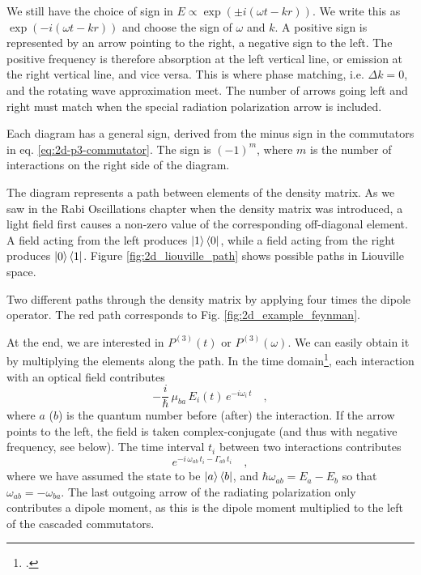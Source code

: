 We still have the choice of sign in $E \propto \exp( \pm i (\omega t - k r) )$. We write this as $\exp(- i (\omega t - k r) )$ and choose the sign of $\omega$ and $k$.
A positive sign is represented by an arrow pointing to the right, a negative sign to the left. The positive frequency is therefore absorption at the left vertical line, or emission at the right vertical line, and vice versa. This is where phase matching, i.e. $\Delta k = 0$, and the rotating wave approximation meet. The number of arrows going left and right must match when the special radiation polarization arrow is included.

Each diagram has a general sign, derived from the minus sign in the commutators in eq. \ref{eq:2d-p3-commutator}. The sign is $(-1)^m$, where $m$ is the number of interactions on the right side of the diagram.

The diagram represents a path between elements of the density matrix. As we saw in the Rabi Oscillations chapter when the density matrix was introduced, a light field first causes a non-zero value of the corresponding off-diagonal element. A field acting from the left produces $\ket{1} \bra{0}$, while a field acting from the right produces $\ket{0} \bra{1}$. Figure \ref{fig:2d_liouville_path} shows possible paths in Liouville space.

\begin{marginfigure}

\caption{
Two different paths  through the density matrix by applying four times the dipole operator. The red path corresponds to Fig. \ref{fig:2d_example_feynman}.}
\label{fig:2d_liouville_path}
\end{marginfigure}

At the end, we are interested in $P^{(3)}(t)$ or $P^{(3)}(\omega)$. We can easily obtain it by multiplying the elements along the path. In the time domain\footcite{Mukamel1995,HammZanni2011,Hamm-dummies}, each interaction with an optical field contributes
\begin{equation}
 - \frac{i}{\hbar} \, \mu_{ba} \, E_i(t)  \, e^{-i \omega_i \, t} \quad ,
\end{equation}
where $a$ ($b$) is the quantum number before (after) the interaction. If the arrow points to the left, the field is taken complex-conjugate (and thus with negative frequency, see below). The time interval $t_i$ between two interactions contributes 
%
\begin{equation}
 e^{-i \, \omega_{ab} \, t_i - \Gamma_{ab} \, t_i} \quad ,
\end{equation}
%
where we have assumed the state to be $\ket{a} \bra{b}$, and  $\hbar \omega_{ab} = E_a - E_b$ so that $\omega_{ab}  = - \omega_{ba} $. The last outgoing arrow of the radiating polarization only contributes a dipole moment, as this is the dipole moment multiplied to the left of the cascaded commutators.

